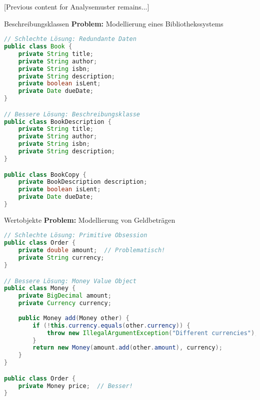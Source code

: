 [Previous content for Analysemuster remains...]

\begin{example}{Beschreibungsklassen}
\textbf{Problem:} Modellierung eines Bibliothekssystems

\begin{lstlisting}[language=Java]
// Schlechte Lösung: Redundante Daten
public class Book {
    private String title;
    private String author;
    private String isbn;
    private String description;
    private boolean isLent;
    private Date dueDate;
}

// Bessere Lösung: Beschreibungsklasse
public class BookDescription {
    private String title;
    private String author;
    private String isbn;
    private String description;
}

public class BookCopy {
    private BookDescription description;
    private boolean isLent;
    private Date dueDate;
}
\end{lstlisting}
\end{example}

\begin{example}{Wertobjekte}
\textbf{Problem:} Modellierung von Geldbeträgen

\begin{lstlisting}[language=Java]
// Schlechte Lösung: Primitive Obsession
public class Order {
    private double amount;  // Problematisch!
    private String currency;
}

// Bessere Lösung: Money Value Object
public class Money {
    private BigDecimal amount;
    private Currency currency;
    
    public Money add(Money other) {
        if (!this.currency.equals(other.currency)) {
            throw new IllegalArgumentException("Different currencies");
        }
        return new Money(amount.add(other.amount), currency);
    }
}

public class Order {
    private Money price;  // Besser!
}
\end{lstlisting}
\end{example}

